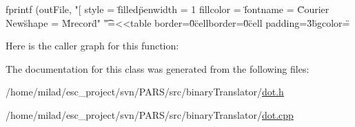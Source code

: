 \begin{DoxyCode}
                                               {
        fprintf (outFile, "[  style = \"filled\" penwidth = 1 fillcolor = \"%
      fontname = \"Courier New\" shape = \"Mrecord\"\n"
                           "\t\tlabel =<<table border=\"0\" cellborder=\"0\" cell
      padding=\"3\" bgcolor=\"%
}
\end{DoxyCode}


Here is the caller graph for this function:




The documentation for this class was generated from the following files:\begin{DoxyCompactItemize}
\item 
/home/milad/esc\_\-project/svn/PARS/src/binaryTranslator/\hyperlink{dot_8h}{dot.h}\item 
/home/milad/esc\_\-project/svn/PARS/src/binaryTranslator/\hyperlink{dot_8cpp}{dot.cpp}\end{DoxyCompactItemize}
